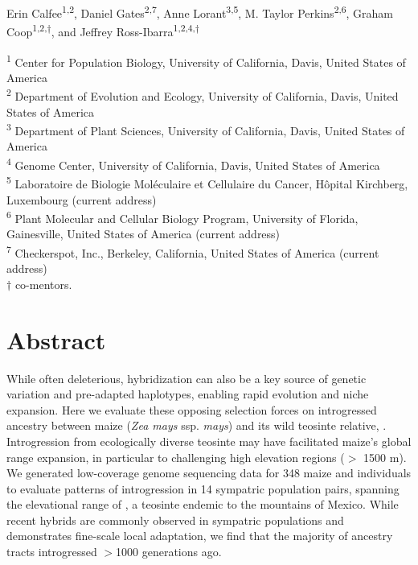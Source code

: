 
\begin{flushleft}

\begin{center}
Erin Calfee\textsuperscript{1,2},
Daniel Gates\textsuperscript{2,7},
Anne Lorant\textsuperscript{3,5},
M. Taylor Perkins\textsuperscript{2,6},
Graham Coop\textsuperscript{1,2,$\dagger$}, and
Jeffrey Ross-Ibarra\textsuperscript{1,2,4,$\dagger$}
\end{center}
\bigskip

\textsuperscript{1} Center for Population Biology, University of California, Davis, United States of America \\
\textsuperscript{2} Department of Evolution and Ecology, University of California, Davis, United States of America \\
\textsuperscript{3} Department of Plant Sciences, University of California, Davis, United States of America \\
\textsuperscript{4} Genome Center, University of California, Davis, United States of America \\
\textsuperscript{5} Laboratoire de Biologie Moléculaire et Cellulaire du Cancer, Hôpital Kirchberg, Luxembourg (current address) \\
\textsuperscript{6} Plant Molecular and Cellular Biology Program, University of Florida, Gainesville, United States of America (current address) \\
\textsuperscript{7} Checkerspot, Inc., Berkeley, California, United States of America (current address) \\
$\dagger$ co-mentors.

\bigskip
\end{flushleft}

\section*{Abstract}
While often deleterious, hybridization can also be a key source of genetic variation and pre-adapted haplotypes, enabling rapid evolution and niche expansion. 
Here we evaluate these opposing selection forces on introgressed ancestry between maize (\textit{Zea mays} ssp. \textit{mays}) and its wild teosinte relative, .
Introgression from ecologically diverse teosinte may have facilitated maize's global range expansion, in particular to challenging high elevation regions ($>$ 1500 m).
We generated low-coverage genome sequencing data for 348 maize and \mexicana individuals to evaluate patterns of introgression in 14 sympatric population pairs, spanning the elevational range of \ec{\mexicana}, a teosinte endemic to the mountains of Mexico. 
While recent hybrids are commonly observed in sympatric populations and \mexicana demonstrates fine-scale local adaptation, we find that the majority of \mexicana ancestry tracts introgressed $>$1000 generations ago.

